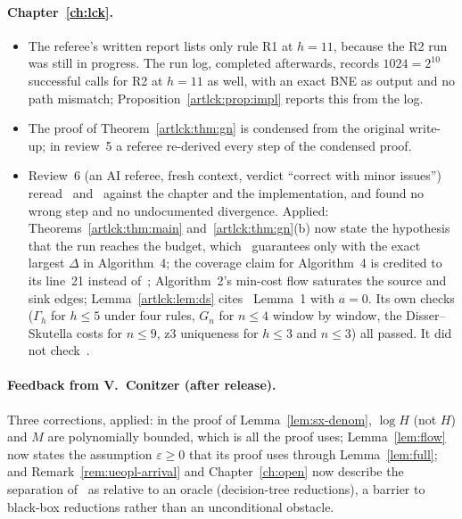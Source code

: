 \paragraph{Chapter~\ref{ch:lck}.}
\begin{itemize}[nosep]
\item The referee's written report lists only rule R1 at $h=11$, because the R2 run was still in
progress. The run log, completed afterwards, records $1024=2^{10}$ successful calls for R2 at $h=11$ as
well, with an exact BNE as output and no path mismatch; Proposition~\ref{artlck:prop:impl} reports this
from the log.
\item The proof of Theorem~\ref{artlck:thm:gn} is condensed from the original write-up; in review~5 a referee re-derived every step of the condensed proof.
\item Review~6 (an AI referee, fresh context, verdict ``correct with minor issues'') reread~\cite[\S6.2]{lck16} and~\cite[\S3.1, Lemma~1]{ds15} against the chapter and the implementation, and found no wrong step and no undocumented divergence. Applied: Theorems~\ref{artlck:thm:main} and~\ref{artlck:thm:gn}(b) now state the hypothesis that the run reaches the budget, which~\cite[Theorem~5]{lck16} guarantees only with the exact largest $\Delta$ in Algorithm~4; the coverage claim for Algorithm~4 is credited to its line~21 instead of~\cite[Lemma~5]{lck16}; Algorithm~2's min-cost flow saturates the source and sink edges; Lemma~\ref{artlck:lem:ds} cites~\cite{ds15} Lemma~1 with $a=0$. Its own checks ($\Gamma_h$ for $h\le5$ under four rules, $G_n$ for $n\le4$ window by window, the Disser--Skutella costs for $n\le9$, z3 uniqueness for $h\le3$ and $n\le3$) all passed. It did not check~\cite[Lemma~8, Theorem~5]{lck16}.
\end{itemize}

\paragraph{Feedback from V.~Conitzer (after release).} Three corrections, applied: in the proof of Lemma~\ref{lem:sx-denom}, $\log H$ (not $H$) and $M$ are polynomially bounded, which is all the proof uses; Lemma~\ref{lem:flow} now states the assumption $\varepsilon\ge0$ that its proof uses through Lemma~\ref{lem:full}; and Remark~\ref{rem:ueopl-arrival} and Chapter~\ref{ch:open} now describe the separation of~\cite{goos22} as relative to an oracle (decision-tree reductions), a barrier to black-box reductions rather than an unconditional obstacle.

